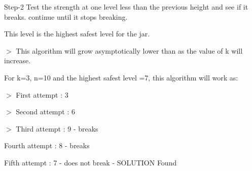 \documentclass[letterpaper,portrait,12pt]{article}
\begin{document}
\begin{flushleft}

\end{flushleft}


\begin{flushleft}
Step-2 Test the strength at one level less than the previous height and see if it breaks. continue until it stops breaking.
\end{flushleft}


\begin{flushleft}

\end{flushleft}


\begin{flushleft}
This level is the highest safest level for the jar.
\end{flushleft}


\begin{flushleft}

\end{flushleft}


\begin{flushleft}
$>$ This algorithm will grow asymptotically lower than as the value of k will increase.
\end{flushleft}


\begin{flushleft}

\end{flushleft}


\begin{flushleft}
For k=3, n=10 and the highest safest level =7, this algorithm will work as:
\end{flushleft}


\begin{flushleft}
 $>$ First attempt : 3
\end{flushleft}


\begin{flushleft}
 $>$ Second attempt : 6
\end{flushleft}


\begin{flushleft}
 $>$ Third attempt : 9 - breaks
\end{flushleft}


\begin{flushleft}
	Fourth attempt : 8 - breaks
\end{flushleft}


\begin{flushleft}
	Fifth attempt : 7 - does not break - SOLUTION Found
\end{flushleft}
\end{document}
